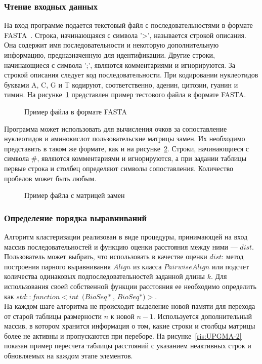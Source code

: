 \subsubsection[Чтение входных данных]{\large Чтение входных данных}
\hspace{\parindent} На вход программе подается текстовый файл с последовательностями в формате FASTA~\cite{FASTAformat}. Строка, начинающаяся с символа '>', называется строкой описания. Она содержит имя последовательности и некоторую дополнительную информацию, предназначенную для идентификации. Другие строки, начинающиеся с символа ';', являются комментариями и игнорируются. За строкой описания следует код последовательности. При кодировании нуклеотидов буквами A, C, G и T кодируют, соответственно, аденин, цитозин, гуанин и тимин. На рисунке~\ref{ris:FASTAexample} представлен пример тестового файла в формате FASTA.
\begin{figure}[H]
	\caption{Пример файла в формате FASTA}
	\label{ris:FASTAexample}
\end{figure}

Программа может использовать для вычисления очков за сопоставление нуклеотидов и аминокислот пользовательские матрицы замен. Их необходимо представить в таком же формате, как и на рисунке~\ref{ris:BLOSUM62}.
Строки, начинающиеся с символа $\#$, являются комментариями и игнорируются, а при задании таблицы первые строка и столбец определяют символы сопоставления. Количество пробелов может быть любым.

\begin{figure}[h]
	\caption{Пример файла с матрицей замен}
	\label{ris:BLOSUM62}
\end{figure}

\subsubsection[Определение порядка выравниваний]{\large Определение порядка выравниваний}
\hspace{\parindent} Алгоритм кластеризации реализован в виде процедуры, принимающей на вход массив последовательностей и функцию оценки расстояния между ними --- $dist$. Пользователь может выбрать, что использовать в качестве оценки $dist$: метод построения парного выравнивания $Align$ из класса $PairwiseAlign$ или подсчет количества одинаковых подпоследовательностей заданной длины $k$. Для использования своей собственной функции расстояния ее необходимо определить как $std::function<int$~$(BioSeq*$, $BioSeq*)>$. \\
\indent На каждом шаге алгоритма не происходит выделение новой памяти для перехода от старой таблицы размерности $n$ к новой $n-1$. Используется дополнительный массив, в котором хранится информация о том, какие строки и столбцы матрицы более не активны и пропускаются при переборе. На рисунке~\ref{ris:UPGMA-2} показан пример пересчета таблицы расстояний с указанием неактивных строк и  обновляемых на каждом этапе элементов.

